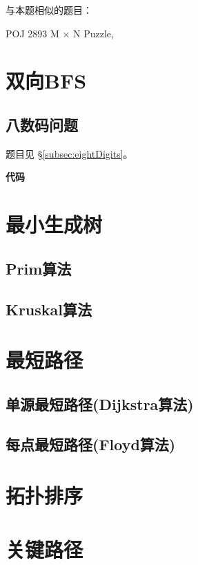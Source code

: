 与本题相似的题目：
\begindot
\item  POJ 2893 M × N Puzzle, 
\myenddot

\section{双向BFS} %
\label{sec:biBFS}
\subsection{八数码问题}
题目见 \S \ref{subsec:eightDigits}。

\textbf{代码}

\begin{Codex}[label=eight_digits_bibfs.c]
\end{Codex}

\section{最小生成树} %

\subsection{Prim算法}

\subsection{Kruskal算法}

\section{最短路径} %

\subsection{单源最短路径(Dijkstra算法)}

\subsection{每点最短路径(Floyd算法)}

\section{拓扑排序} %

\section{关键路径} %

